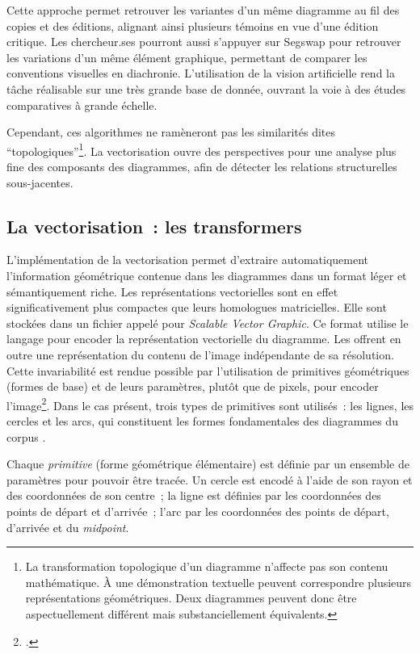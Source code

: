 Cette approche permet retrouver les variantes d'un même diagramme au fil
des copies et des éditions, alignant ainsi plusieurs témoins en vue
d'une édition critique. Les chercheur.ses pourront aussi s'appuyer sur
Segswap pour retrouver les variations d'un même élément graphique,
permettant de comparer les conventions visuelles en diachronie.
L'utilisation de la vision artificielle rend la tâche réalisable sur une
très grande base de donnée, ouvrant la voie à des études comparatives à
grande échelle.

Cependant, ces algorithmes ne ramèneront pas les similarités dites
``topologiques''\footnote{La transformation topologique d'un diagramme
  n'affecte pas son contenu mathématique. À une démonstration textuelle
  peuvent correspondre plusieurs représentations géométriques. Deux
  diagrammes peuvent donc être aspectuellement différent mais
  substanciellement équivalents.}. La vectorisation ouvre des
perspectives pour une analyse plus fine des composants des diagrammes,
afin de détecter les relations structurelles sous-jacentes.

\hypertarget{la-vectorisation-les-transformers}{%
\subsection{La vectorisation~: les
transformers}\label{la-vectorisation-les-transformers}}

L'implémentation de la vectorisation permet d'extraire automatiquement
l'information géométrique contenue dans les diagrammes dans un format
léger et sémantiquement riche. Les représentations vectorielles sont en
effet significativement plus compactes que leurs homologues
matricielles. Elle sont stockées dans un fichier appelé \svg pour
\emph{Scalable Vector Graphic}. Ce format utilise le langage \xml pour
encoder la représentation vectorielle du diagramme. Les \svgs offrent en
outre une représentation du contenu de l'image indépendante de sa
résolution. Cette invariabilité est rendue possible par l'utilisation de
primitives géométriques (formes de base) et de leurs paramètres, plutôt
que de pixels, pour encoder l'image\footcite{noauthor_tutoriel_2024}. Dans
le cas présent, trois types de primitives sont utilisés~: les lignes,
les cercles et les arcs, qui constituent les formes fondamentales des
diagrammes du corpus \eida.

Chaque \emph{primitive} (forme géométrique élémentaire) est définie par
un ensemble de paramètres pour pouvoir être tracée. Un cercle est encodé
à l'aide de son rayon et des coordonnées de son centre~; la ligne est
définies par les coordonnées des points de départ et d'arrivée~; l'arc
par les coordonnées des points de départ, d'arrivée et du
\emph{midpoint}.

